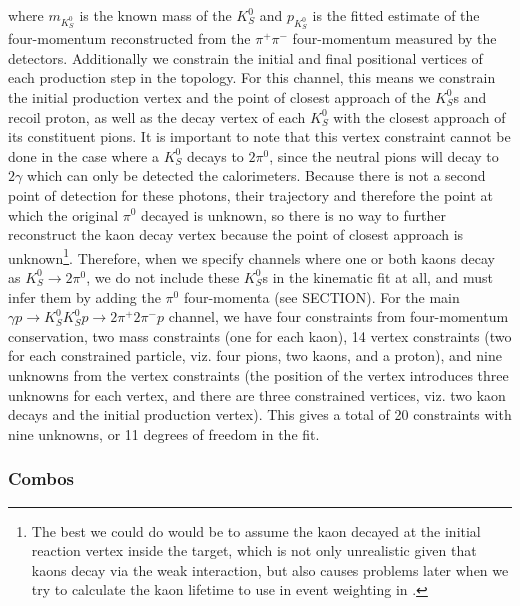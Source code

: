 where $m_{K_S^0}$ is the known mass of the $K_S^0$ and $p_{K_S^0}$ is the fitted estimate of the four-momentum reconstructed from the $\pi^+\pi^-$ four-momentum measured by the detectors. Additionally we constrain the initial and final positional vertices of each production step in the topology. For this channel, this means we constrain the initial production vertex and the point of closest approach of the $K_S^0$s and recoil proton, as well as the decay vertex of each $K_S^0$ with the closest approach of its constituent pions. It is important to note that this vertex constraint cannot be done in the case where a $K_S^0$ decays to $2\pi^0$, since the neutral pions will decay to $2\gamma$ which can only be detected the calorimeters. Because there is not a second point of detection for these photons, their trajectory and therefore the point at which the original $\pi^0$ decayed is unknown, so there is no way to further reconstruct the kaon decay vertex because the point of closest approach is unknown\footnote{The best we could do would be to assume the kaon decayed at the initial reaction vertex inside the target, which is not only unrealistic given that kaons decay via the weak interaction, but also causes problems later when we try to calculate the kaon lifetime to use in event weighting in .}. Therefore, when we specify channels where one or both kaons decay as $K_S^0\to 2\pi^0$, we do not include these $K_S^0$s in the kinematic fit at all, and must infer them by adding the $\pi^0$ four-momenta (see {\color{red} SECTION}). For the main $\gamma p \to K_S^0K_S^0p \to 2\pi^+2\pi^-p$ channel, we have four constraints from four-momentum conservation, two mass constraints (one for each kaon), 14 vertex constraints (two for each constrained particle, viz. four pions, two kaons, and a proton), and nine unknowns from the vertex constraints (the position of the vertex introduces three unknowns for each vertex, and there are three constrained vertices, viz. two kaon decays and the initial production vertex). This gives a total of 20 constraints with nine unknowns, or 11 degrees of freedom in the fit.

\subsubsection{Combos}


